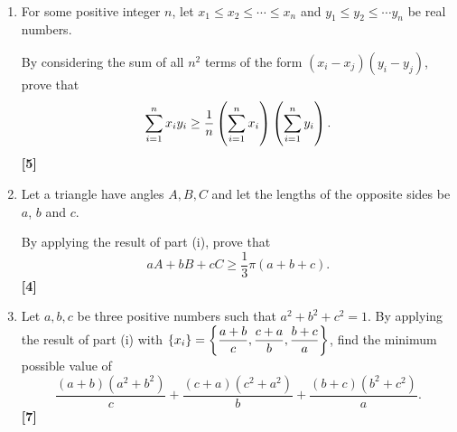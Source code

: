 \begin{prbm} \
\begin{enumerate}[label=(\roman*)]
\item For some positive integer $n$, let $x_1\le x_2\le\cdots\le x_n$ and $y_1\le y_2\le\cdots y_n$ be real numbers.

By considering the sum of all $n^2$ terms of the form $(x_i-x_j)(y_i-y_j)$, prove that
\[ \sum_{i=1}^nx_iy_i\ge\frac{1}{n}\left(\sum_{i=1}^nx_i\right)\left(\sum_{i=1}^ny_i\right). \]
\hfill \textbf{[5]}

\item Let a triangle have angles $A,B,C$ and let the lengths of the opposite sides be $a$, $b$ and $c$.

By applying the result of part (i), prove that
\[ aA+bB+cC\ge\frac{1}{3}\pi(a+b+c). \]
\hfill \textbf{[4]}

\item Let $a,b,c$ be three positive numbers such that $a^2+b^2+c^2=1$. By applying the result of part (i) with $\{x_i\}=\left\{\dfrac{a+b}{c},\dfrac{c+a}{b},\dfrac{b+c}{a}\right\}$, find the minimum possible value of 
\[ \frac{(a+b)(a^2+b^2)}{c}+\frac{(c+a)(c^2+a^2)}{b}+\frac{(b+c)(b^2+c^2)}{a}. \]
\hfill \textbf{[7]}
\end{enumerate}
\end{prbm}

